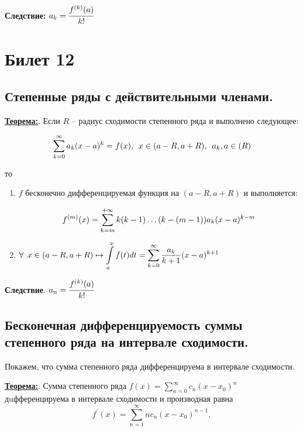 \documentclass[a4paper,12pt]{article} %
\begin{document}
      \textbf{Следствие:}
      $a_k = \cfrac{f^{(k)}(a)}{k!}
	  $


\newpage
\section{Билет 12}

\subsection{Степенные ряды с действительными членами.}

\underline{\textbf{Теорема:}}. Если $R$ -- радиус сходимости степенного ряда и выполнено следующее:

\begin{equation*}
\Large \displaystyle \sum\limits_{k = 0}^{\infty} a_k(x-a)^k = f(x),\ x\in (a - R, a + R),\ a_k,a \in \mathbb(R)
\end{equation*}

то
\begin{enumerate}
\item $f$ бесконечно дифференцируемая функция на $(a-R,a+R)$ и  выполняется: 

\begin{equation*}
\Large \displaystyle f^{(m)}(x) = \sum\limits_{k = m}^{+\infty} k(k-1)\dots (k - (m-1))a_k(x-a)^{k-m}
\end{equation*}

\item $\Large \displaystyle \forall\ x \in (a - R, a + R) \mapsto \int\limits_{a}^{x} f(t)dt = \sum\limits_{k = 0}^{\infty} \frac{a_k}{k+1}(x-a)^{k+1}$ 

\end{enumerate} 

\textbf{Следствие}. $a_n = \cfrac{f^{(k)}(a)}{k!}$


\subsection{Бесконечная дифференцируемость суммы степенного ряда на интервале сходимости.}

Покажем, что сумма степенного ряда дифференцируема в интервале сходимости.

\underline{\textbf{Теорема:}}. Сумма степенного ряда $f(x)=\sum\limits_{n=0}^{\infty} c_{n}\left(x-x_{0}\right)^{n}$ дuфференцируема в интервале сходимости и производная равна
\begin{equation*}
f^{\prime}(x)=\sum\limits_{n=1}^{\infty} n c_{n}\left(x-x_{0}\right)^{n-1},
\end{equation*}
\end{document}
